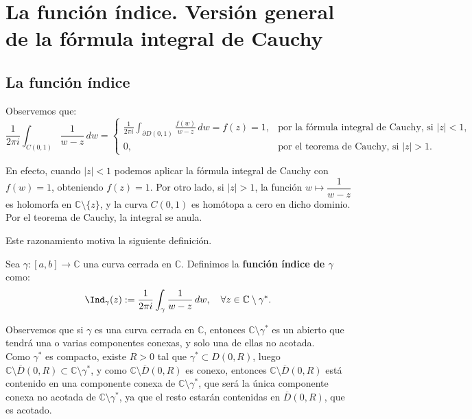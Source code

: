 \section{La función índice. Versión general de la fórmula integral de Cauchy}
\subsection{La función índice}

Observemos que:
\[
\frac{1}{2\pi i} \int_{C(0,1)} \frac{1}{w - z}\,dw =
\begin{cases}
    \displaystyle \frac{1}{2\pi i} \int_{\partial D(0,1)} \frac{f(w)}{w - z}\,dw = f(z) = 1, & \text{por la fórmula integral de Cauchy, si } |z| < 1, \\[1em]
    0, & \text{por el teorema de Cauchy, si } |z| > 1.
\end{cases}
\]

En efecto, cuando $|z| < 1$ podemos aplicar la fórmula integral de Cauchy con $f(w) = 1$, obteniendo $f(z) = 1$.  
Por otro lado, si $|z| > 1$, la función $w \mapsto \dfrac{1}{w - z}$ es holomorfa en $\mathbb{C} \setminus \{z\}$, y la curva $C(0,1)$ es homótopa a cero en dicho dominio. Por el teorema de Cauchy, la integral se anula.

Este razonamiento motiva la siguiente definición.

\begin{definición} 
Sea $\gamma : [a,b] \to \mathbb{C}$ una curva cerrada en $\mathbb{C}$.  
Definimos la \textbf{función índice de $\gamma$} como:
\[
\Ind_\gamma(z) := \frac{1}{2\pi i} \int_\gamma \frac{1}{w - z}\,dw, 
\quad \forall z \in \mathbb{C} \setminus \gamma^*.
\]
\end{definición}

Observemos que si $\gamma$ es una curva cerrada en $\mathbb{C}$, entonces $\mathbb{C} \setminus \gamma^*$ es un abierto que tendrá una o varias componentes conexas, y solo una de ellas no acotada.\\

Como $\gamma^*$ es compacto, existe $R > 0$ tal que $\gamma^* \subset D(0,R)$, luego $\mathbb{C} \setminus \overline{D}(0,R) \subset \mathbb{C} \setminus \gamma^*$, y como $\mathbb{C} \setminus \overline{D}(0,R)$ es conexo, entonces $\mathbb{C} \setminus \overline{D}(0,R)$ está contenido en una componente conexa de $\mathbb{C} \setminus \gamma^*$, que será la única componente conexa no acotada de $\mathbb{C} \setminus \gamma^*$, ya que el resto estarán  contenidas en $\overline{D}(0,R)$, que es acotado.\\

